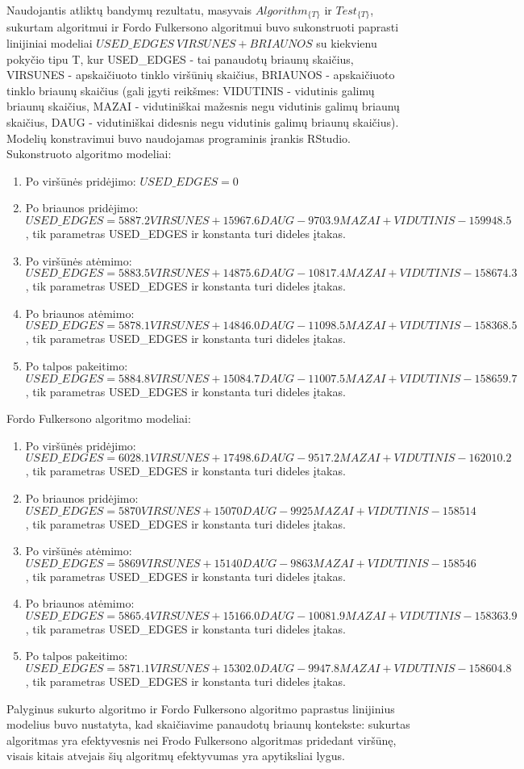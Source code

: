Naudojantis atliktų bandymų rezultatu, masyvais $Algorithm_{\{T\}}$ ir $Test_{\{T\}}$,  sukurtam algoritmui ir Fordo Fulkersono algoritmui buvo sukonstruoti paprasti linijiniai modeliai $USED\_EDGES ~ VIRSUNES + BRIAUNOS$ su kiekvienu pokyčio tipu T, kur USED\_EDGES - tai panaudotų briaunų skaičius, VIRSUNES - apskaičiuoto tinklo viršūnių skaičius, BRIAUNOS - apskaičiuoto tinklo briaunų skaičius (gali įgyti reikšmes: VIDUTINIS - vidutinis galimų briaunų skaičius, MAZAI - vidutiniškai mažesnis negu vidutinis galimų briaunų skaičius, DAUG - vidutiniškai didesnis negu vidutinis galimų briaunų skaičius). Modelių konstravimui buvo naudojamas programinis įrankis RStudio. Sukonstruoto algoritmo modeliai:
\begin{enumerate}
	\item Po viršūnės pridėjimo: $USED\_EDGES = 0$
	\item Po briaunos pridėjimo: $USED\_EDGES = 5887.2 VIRSUNES + 15967.6 DAUG - 9703.9 MAZAI + VIDUTINIS - 159948.5$, tik parametras USED\_EDGES ir konstanta turi dideles įtakas.
	\item Po viršūnės atėmimo: $USED\_EDGES = 5883.5 VIRSUNES + 14875.6 DAUG - 10817.4 MAZAI + VIDUTINIS - 158674.3$, tik parametras USED\_EDGES ir konstanta turi dideles įtakas.
	\item Po briaunos atėmimo: $USED\_EDGES = 5878.1 VIRSUNES + 14846.0 DAUG -11098.5 MAZAI + VIDUTINIS - 158368.5$, tik parametras USED\_EDGES ir konstanta turi dideles įtakas.
	\item Po talpos pakeitimo: $USED\_EDGES = 5884.8 VIRSUNES + 15084.7 DAUG - 11007.5 MAZAI + VIDUTINIS - 158659.7$, tik parametras USED\_EDGES ir konstanta turi dideles įtakas.
\end{enumerate}
Fordo Fulkersono algoritmo modeliai:
\begin{enumerate}
	\item Po viršūnės pridėjimo: $USED\_EDGES =6028.1 VIRSUNES + 17498.6 DAUG - 9517.2 MAZAI + VIDUTINIS - 162010.2$, tik parametras USED\_EDGES ir konstanta turi dideles įtakas.
	\item Po briaunos pridėjimo: $USED\_EDGES = 5870 VIRSUNES + 15070 DAUG - 9925 MAZAI + VIDUTINIS - 158514$, tik parametras USED\_EDGES ir konstanta turi dideles įtakas.
	\item Po viršūnės atėmimo: $USED\_EDGES = 5869 VIRSUNES + 15140DAUG -9863 MAZAI + VIDUTINIS - 158546$, tik parametras USED\_EDGES ir konstanta turi dideles įtakas.
	\item Po briaunos atėmimo: $USED\_EDGES = 5865.4 VIRSUNES + 15166.0 DAUG - 10081.9 MAZAI + VIDUTINIS - 158363.9$, tik parametras USED\_EDGES ir konstanta turi dideles įtakas.
	\item Po talpos pakeitimo: $USED\_EDGES = 5871.1 VIRSUNES + 15302.0 DAUG - 9947.8 MAZAI + VIDUTINIS - 158604.8$, tik parametras USED\_EDGES ir konstanta turi dideles įtakas.
\end{enumerate}

Palyginus sukurto algoritmo ir Fordo Fulkersono algoritmo paprastus linijinius modelius buvo nustatyta, kad skaičiavime panaudotų briaunų kontekste: sukurtas algoritmas yra efektyvesnis nei Frodo Fulkersono algoritmas pridedant viršūnę, visais kitais atvejais šių algoritmų efektyvumas yra apytiksliai lygus.